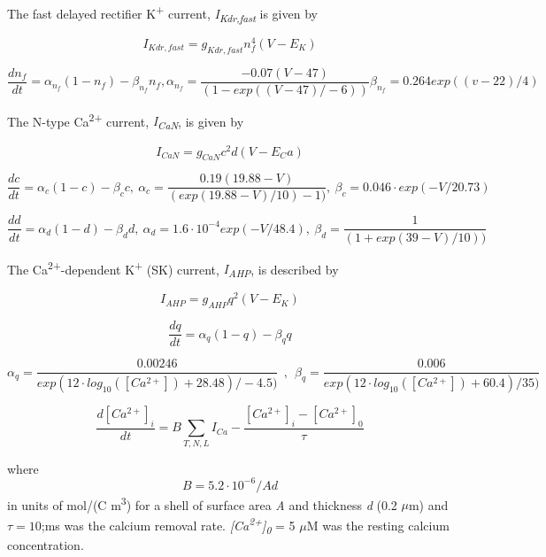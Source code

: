 \documentclass[12pt]{article}
\begin{document}
The fast delayed rectifier K\textsuperscript{+} current, \textit{I}\textit{\textsubscript{Kdr,fast}} is given by\ \ 


\begin{equation}
I_{Kdr, fast}=g_{Kdr, fast}n_f^4(V-E_K)
\end{equation}

\begin{equation}
\frac{dn_f}{dt}=\alpha_{n_f}(1-n_f)-\beta_{n_f}n_f , 
\alpha_{n_f}=\frac{-0.07(V-47)}{(1-exp((V-47)/-6))}  \beta_{n_f}=0.264exp((v-22)/4)
\end{equation}


The N-type Ca\textsuperscript{2+} current, \textit{I}\textit{\textsubscript{CaN}}, is given by


\begin{equation}
I_{CaN}=g_{CaN}c^2d(V-E_Ca)
\end{equation}

\begin{equation}
\frac{dc}{dt}=\alpha_c(1-c)-\beta_cc , \ 
\alpha_c=\frac{0.19(19.88-V)}{(exp(19.88-V)/10)-1)}, \  \beta_c=0.046 \cdot exp(-V/20.73)
\end{equation}

\begin{equation}
\frac{dd}{dt} = \alpha_d(1-d)-\beta_dd , \ \alpha_d=1.6\cdot
10^{-4}exp(-V/48.4) , \  \beta_d=\frac 1{(1+exp(39-V)/10))}
\end{equation}


The Ca\textsuperscript{2+}-dependent K\textsuperscript{+} (SK) current, \textit{I}\textit{\textsubscript{AHP}}, is
described by


\begin{equation}
I_{AHP} = g_{AHP} q^2 (V-E_K)
\end{equation}

\begin{equation}
\frac{dq}{dt}=\alpha_q(1-q)-\beta_qq
\end{equation}

\begin{equation}
\alpha_q=\frac{0.00246}{exp(12\cdot log_{10}([Ca^{2+}])+28.48)/-4.5)} \ \ ,\ \ 
\beta_q=\frac{0.006}{exp(12\cdot log_{10}([Ca^{2+}])+60.4)/35)}
\end{equation}

\begin{equation}
\frac{d[Ca^{2+}]_i}{dt}=B\sum_{T, N, L}
I_{Ca}-\frac{[Ca^{2+}]_i-[Ca^{2+}]_0}{\tau}
\end{equation}

where
\begin{equation}
B = 5.2\cdot 10^{-6}/Ad
\end{equation}
in units of mol/(C m\textsuperscript{3}) for a shell of
surface area \textit{A} and thickness \textit{d} (0.2 $\mu $m) and  $\tau=10$;ms was the calcium removal rate. \textit{[Ca}\textit{\textsuperscript{2+}}\textit{]}\textit{\textsubscript{0}} = 5 $\mu$M was the resting calcium concentration. 
\end{document}
